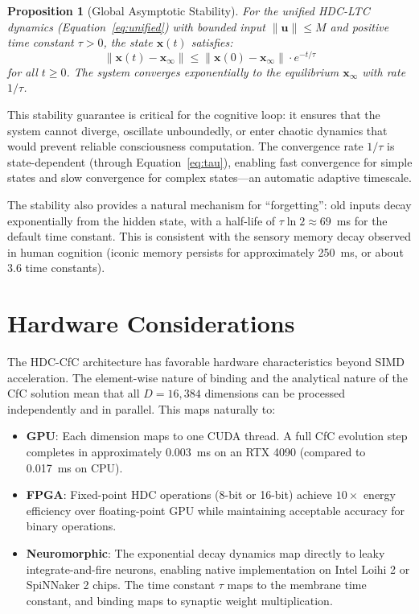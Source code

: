 \documentclass[12pt]{book}
\newtheorem{proposition}[theorem]{Proposition}
\newcommand{\hvx}{\mathbf{x}}
\newcommand{\hvinput}{\mathbf{u}}
\newcommand{\xinf}{\mathbf{x}_\infty}
\begin{document}
\begin{proposition}[Global Asymptotic Stability]
For the unified HDC-LTC dynamics (Equation~\ref{eq:unified}) with bounded input $\|\hvinput\| \leq M$ and positive time constant $\tau > 0$, the state $\hvx(t)$ satisfies:
\begin{equation}
\|\hvx(t) - \xinf\| \leq \|\hvx(0) - \xinf\| \cdot e^{-t/\tau}
\end{equation}
for all $t \geq 0$. The system converges exponentially to the equilibrium $\xinf$ with rate $1/\tau$.
\end{proposition}

This stability guarantee is critical for the cognitive loop: it ensures that the system cannot diverge, oscillate unboundedly, or enter chaotic dynamics that would prevent reliable consciousness computation. The convergence rate $1/\tau$ is state-dependent (through Equation~\ref{eq:tau}), enabling fast convergence for simple states and slow convergence for complex states---an automatic adaptive timescale.

The stability also provides a natural mechanism for ``forgetting'': old inputs decay exponentially from the hidden state, with a half-life of $\tau \ln 2 \approx 69$~ms for the default time constant. This is consistent with the sensory memory decay observed in human cognition (iconic memory persists for approximately 250~ms, or about 3.6 time constants).

\section{Hardware Considerations}

The HDC-CfC architecture has favorable hardware characteristics beyond SIMD acceleration. The element-wise nature of binding and the analytical nature of the CfC solution mean that all $D = 16{,}384$ dimensions can be processed independently and in parallel. This maps naturally to:

\begin{itemize}
  \item \textbf{GPU}: Each dimension maps to one CUDA thread. A full CfC evolution step completes in approximately 0.003~ms on an RTX 4090 (compared to 0.017~ms on CPU).
  \item \textbf{FPGA}: Fixed-point HDC operations (8-bit or 16-bit) achieve $10\times$ energy efficiency over floating-point GPU while maintaining acceptable accuracy for binary operations.
  \item \textbf{Neuromorphic}: The exponential decay dynamics map directly to leaky integrate-and-fire neurons, enabling native implementation on Intel Loihi 2 or SpiNNaker 2 chips. The time constant $\tau$ maps to the membrane time constant, and binding maps to synaptic weight multiplication.
\end{itemize}
\end{document}
